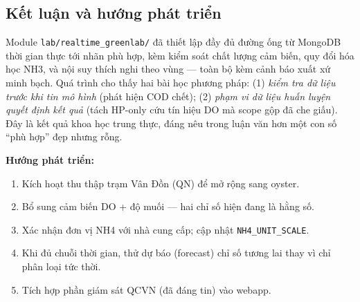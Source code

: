 
\subsection{Kết luận và hướng phát triển}
Module \texttt{lab/realtime\_greenlab/} đã thiết lập đầy đủ đường ống từ MongoDB thời gian thực tới nhãn phù hợp, kèm kiểm soát chất lượng cảm biến, quy đổi hóa học NH3, và nội suy thích nghi theo vùng --- toàn bộ kèm cảnh báo xuất xứ minh bạch. Quá trình cho thấy hai bài học phương pháp: (1) \emph{kiểm tra dữ liệu trước khi tin mô hình} (phát hiện COD chết); (2) \emph{phạm vi dữ liệu huấn luyện quyết định kết quả} (tách HP-only cứu tín hiệu DO mà scope gộp đã che giấu). Đây là kết quả khoa học trung thực, đáng nêu trong luận văn hơn một con số ``phù hợp'' đẹp nhưng rỗng.

\textbf{Hướng phát triển:}
\begin{enumerate}[nosep]
  \item Kích hoạt thu thập trạm Vân Đồn (QN) để mở rộng sang oyster.
  \item Bổ sung cảm biến DO + độ muối --- hai chỉ số hiện đang là hằng số.
  \item Xác nhận đơn vị NH4 với nhà cung cấp; cập nhật \texttt{NH4\_UNIT\_SCALE}.
  \item Khi đủ chuỗi thời gian, thử dự báo (forecast) chỉ số tương lai thay vì chỉ phân loại tức thời.
  \item Tích hợp phần giám sát QCVN (đã đáng tin) vào webapp.
\end{enumerate}
